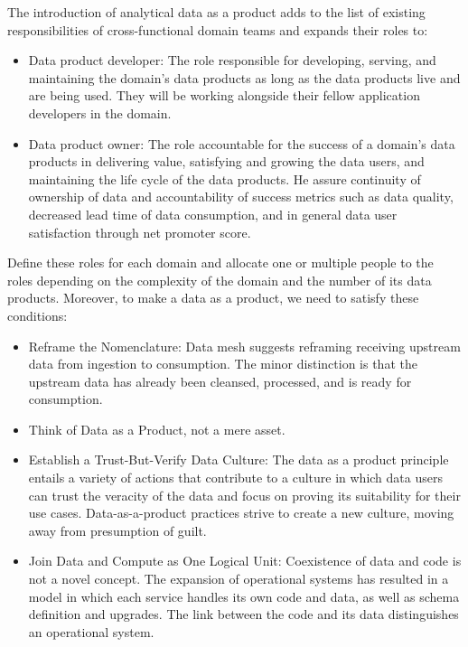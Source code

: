 \documentclass[12pt, a4paper]{book}
\begin{document}
The introduction of analytical data as a product adds to the list of existing responsibilities
of cross-functional domain teams \cite{datamesh2022ch3} and expands their roles to:
	\begin{itemize}
		\item Data product developer: The role responsible for developing, serving, and maintaining the domain’s data products as long as the data products live and are being used. They will be working alongside their fellow application developers in the domain.
		\item Data product owner: The role accountable for the success of a domain’s data products in delivering value, satisfying and growing the data users, and maintaining the life cycle of the data products. He assure continuity of ownership of data and accountability of success metrics such as data quality, decreased lead time of data consumption, and in general data user satisfaction through net promoter score.
	\end{itemize}

Define these roles for each domain and allocate one or multiple people to the roles depending on the complexity of the domain and the number of its data products. Moreover, to make a data as a product, we need to satisfy these conditions:
	\begin{itemize}
		\item Reframe the Nomenclature: Data mesh suggests reframing receiving upstream data from ingestion to consumption. The minor distinction is that the upstream data has already been cleansed, processed, and is ready for consumption.
		\item Think of Data as a Product, not a mere asset.
		\item Establish a Trust-But-Verify Data Culture: The data as a product principle entails a variety of actions that contribute to a culture in which data users can trust the veracity of the data and focus on proving its suitability for their use cases. Data-as-a-product practices strive to create a new culture, moving away from presumption of guilt.
		\item Join Data and Compute as One Logical Unit: Coexistence of data and code is not a novel concept. The expansion of operational systems has resulted in a model in which each service handles its own code and data, as well as schema definition and upgrades. The link between the code and its data distinguishes an operational system.
	\end{itemize}
\end{document}
